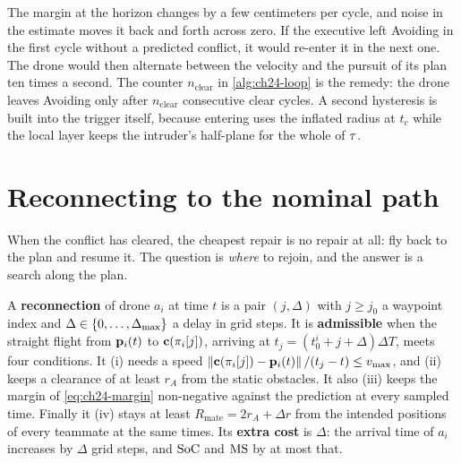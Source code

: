 \begin{pitfall}
The margin at the horizon changes by a few centimeters per cycle, and noise
in the estimate moves it back and forth across zero. If the executive left
Avoiding in the first cycle without a predicted conflict, it would re-enter
it in the next one. The drone would then alternate between the \orca
velocity and the pursuit of its plan ten times a second. The counter
$n_{\mathrm{clear}}$ in \cref{alg:ch24-loop} is the remedy: the drone leaves
Avoiding only after $n_{\mathrm{clear}}$ consecutive clear cycles. A second
hysteresis is built into the trigger itself, because entering uses the
inflated radius at $t_c$ while the local layer keeps the intruder's
half-plane for the whole of $\tau$.
\end{pitfall}

\section{Reconnecting to the nominal path}
\label{sec:ch24-reconnect}

When the conflict has cleared, the cheapest repair is no repair at all: fly
back to the plan and resume it. The question is \emph{where} to rejoin, and
the answer is a search along the plan.

\begin{definition}
\label{def:ch24-reconnection}
A \textbf{reconnection} of drone $a_i$ at time $t$ is a pair $(j, \Delta)$
with $j \ge j_0$ a waypoint index and $\Delta \in \left\{ 0, \dots, \Delta_{\max} \right\}$
a delay in grid steps. It is \textbf{admissible} when the straight flight
from $\mathbf{p}_i(t)$ to $\mathbf{c}(\pi_i[j])$, arriving at
$t_j = (t_0^i + j + \Delta)\Delta T$, meets four conditions. It
(i) needs a speed $\left\lVert \mathbf{c}(\pi_i[j]) - \mathbf{p}_i(t) \right\rVert/(t_j - t) \le v_{\max}$,
and (ii) keeps a clearance of at least $r_A$ from the static obstacles.
It also (iii) keeps the margin of \cref{eq:ch24-margin} non-negative against
the prediction at every sampled time. Finally it (iv) stays at least
$R_{\mathrm{mate}} = 2r_A + \Delta r$ from the intended positions of every
teammate at the same times. Its \textbf{extra cost} is $\Delta$: the
arrival time of $a_i$ increases by $\Delta$ grid steps, and $\mathrm{SoC}$ and
$\mathrm{MS}$ by at most that.
\end{definition}

